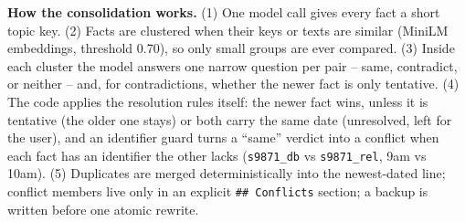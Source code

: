 \documentclass[11pt]{article}
\begin{document}
\endgroup
\textbf{How the consolidation works.} (1) One model call gives every fact a short topic key. (2) Facts are clustered when their keys or texts are similar (MiniLM embeddings, threshold 0.70), so only small groups are ever compared. (3) Inside each cluster the model answers one narrow question per pair -- same, contradict, or neither -- and, for contradictions, whether the newer fact is only tentative. (4) The code applies the resolution rules itself: the newer fact wins, unless it is tentative (the older one stays) or both carry the same date (unresolved, left for the user), and an identifier guard turns a ``same'' verdict into a conflict when each fact has an identifier the other lacks (\verb|s9871_db| vs \verb|s9871_rel|, 9am vs 10am). (5) Duplicates are merged deterministically into the newest-dated line; conflict members live only in an explicit \verb|## Conflicts| section; a backup is written before one atomic rewrite.
\end{document}
